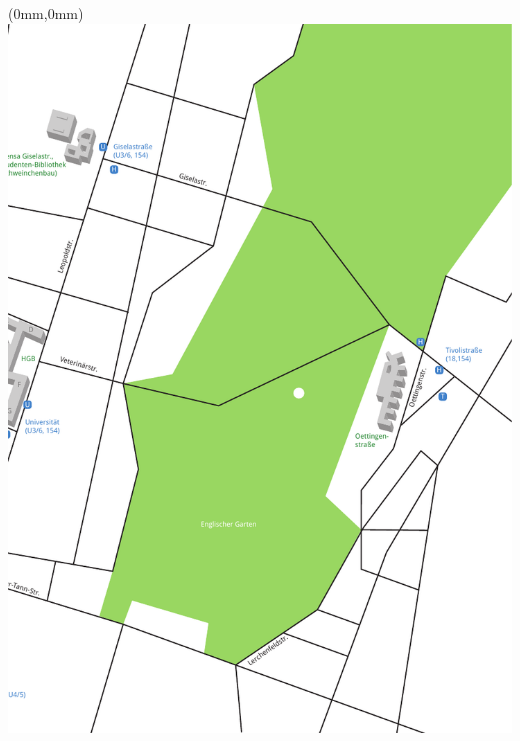 \documentclass[twoside,a5paper,fontsize=9pt]{scrartcl}
\begin{document}
\thispagestyle{empty}
\begin{textblock*}{\paperwidth}(0mm,0mm)
   \noindent\includegraphics[width=\paperwidth,height=\paperheight]{lageplan_rechts}
\end{textblock*}
\mbox{}

\clearpage
\end{document}
